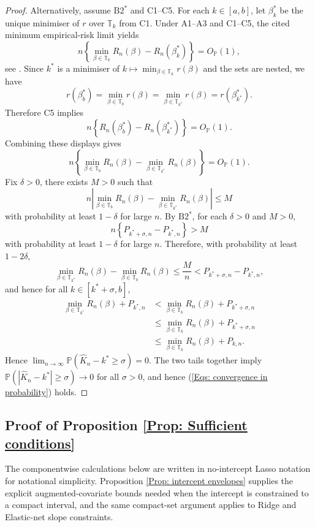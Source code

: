 \documentclass[12pt]{article}
\newcommand{\blue}[1]{\textcolor[rgb]{0.00,0.00,1.00}{#1}}
\theoremstyle{remark}
\theoremstyle{plain}
\begin{document}
\begin{proof}
Alternatively, assume $\mathrm{B2}^{*}$ and C1--C5. For each $k\in\left[a,b\right]$,
let $\beta_{k}^{*}$ be the unique minimiser of $r$ over $\mathbb{T}_{k}$
from C1. \blue{Under A1--A3 and C1--C5, the cited minimum empirical-risk limit yields}
\[
n\left\{ \min_{\beta\in\mathbb{T}_{k}}R_{n}(\beta)-R_{n}(\beta_{k}^{*})\right\} =O_{\mathbb{P}}(1),
\]
see \citet[Lemma 3]{nguyen_panic:_2023}. Since $k^{*}$ is a minimiser
of $k\mapsto\min_{\beta\in\mathbb{T}_{k}}r(\beta)$ and the sets are
nested, we have
\[
r(\beta_{b}^{*})=\min_{\beta\in\mathbb{T}_{b}}r(\beta)=\min_{\beta\in\mathbb{T}_{k^{*}}}r(\beta)=r(\beta_{k^{*}}^{*}).
\]
Therefore C5 implies
\[
n\left\{ R_{n}(\beta_{b}^{*})-R_{n}(\beta_{k^{*}}^{*})\right\} =O_{\mathbb{P}}(1).
\]
Combining these displays gives
\[
n\left\{ \min_{\beta\in\mathbb{T}_{b}}R_{n}(\beta)-\min_{\beta\in\mathbb{T}_{k^{*}}}R_{n}(\beta)\right\} =O_{\mathbb{P}}(1).
\]
Fix $\delta>0$, there exists $M>0$ such that
\[
n\left|\min_{\beta\in\mathbb{T}_{b}}R_{n}(\beta)-\min_{\beta\in\mathbb{T}_{k^{*}}}R_{n}(\beta)\right|\le M
\]
with probability at least $1-\delta$ for large $n$. By $\mathrm{B2}^{*}$,
for each $\delta>0$ and $M>0$,
\[
n\left\{ P_{k^{*}+\sigma,n}-P_{k^{*},n}\right\} >M
\]
with probability at least $1-\delta$ for large $n$. Therefore, with
probability at least $1-2\delta$,
\[
\min_{\beta\in\mathbb{T}_{k^{*}}}R_{n}(\beta)-\min_{\beta\in\mathbb{T}_{b}}R_{n}(\beta)\le\frac{M}{n}<P_{k^{*}+\sigma,n}-P_{k^{*},n},
\]
and hence for all $k\in\left[k^{*}+\sigma,b\right]$,
\begin{align*}
\min_{\beta\in\mathbb{T}_{k^{*}}}R_{n}(\beta)+P_{k^{*},n} & <\min_{\beta\in\mathbb{T}_{b}}R_{n}(\beta)+P_{k^{*}+\sigma,n}\\
 & \le\min_{\beta\in\mathbb{T}_{k}}R_{n}(\beta)+P_{k^{*}+\sigma,n}\\
 & \le\min_{\beta\in\mathbb{T}_{k}}R_{n}(\beta)+P_{k,n}.
\end{align*}
Hence $\lim_{n\to\infty}\mathbb{P}\left(\hat{K}_{n}-k^{*}\ge\sigma\right)=0$.
The two tails together imply $\mathbb{P}(|\hat{K}_{n}-k^{*}|\ge\sigma)\to0$
for all $\sigma>0$, and hence (\ref{Eqs: convergence in probability})
holds.
\end{proof}

\subsection{Proof of Proposition \ref{Prop: Sufficient conditions}}
The componentwise calculations below are written in no-intercept Lasso notation for notational simplicity. Proposition \ref{Prop: intercept envelopes} supplies the explicit augmented-covariate bounds needed when the intercept is constrained to a compact interval, and the same compact-set argument applies to Ridge and Elastic-net slope constraints.
\end{document}

